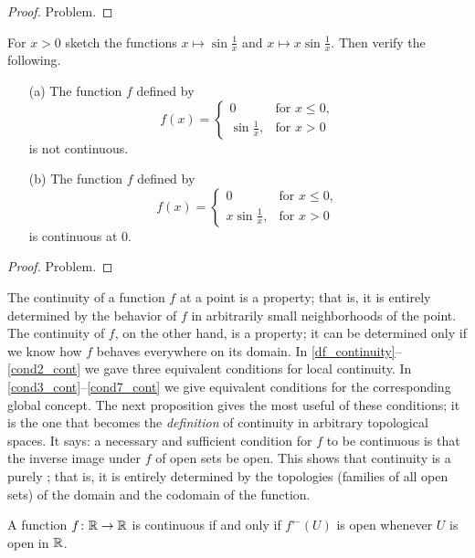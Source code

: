 \begin{proof} Problem.  \ns \end{proof}

\begin{exam} For $x > 0$ sketch the functions $x \mapsto \sin\frac1x$ and
$x \mapsto x\sin\frac1x$.  Then verify the following.
 \begin{enumerate}
  \item[(a)] The function $f$ defined by
   \[f(x) = \begin{cases}        0    &\text{for $x \le 0$}, \\
                      \sin\frac1x,    &\text{for $x > 0$}
            \end{cases}\]
is not continuous.
  \item[(b)]   The function $f$ defined by
   \[f(x) = \begin{cases}        0    &\text{for $x \le 0$}, \\
                    x \sin\frac1x,    &\text{for $x > 0$}
            \end{cases}\]
is continuous at $0$.
 \end{enumerate}
\end{exam}

\begin{proof} Problem.  \ns \end{proof}

The continuity of a function $f$ at a point is a
 property; that is, it is entirely determined by the behavior of $f$ in arbitrarily
small neighborhoods of the point. The continuity of $f$, on the other hand, is a
 property; it can be determined only if we know how $f$ behaves everywhere on its
domain.  In \ref{df_continuity}--\ref{cond2_cont} we gave three equivalent conditions for
local continuity.  In \ref{cond3_cont}--\ref{cond7_cont} we give equivalent conditions for the
corresponding global concept.  The next proposition gives the most useful of these conditions;
it is the one that becomes the \emph{definition} of continuity in arbitrary topological
spaces. It says: a necessary and sufficient condition for $f$ to be continuous is that the
inverse image under $f$ of open sets be open.  This shows that continuity is a purely
; that is, it is entirely determined by the topologies (families of
all open sets) of the domain and the codomain of the function.

\begin{prop}\label{cond3_cont} A function $f\colon\mathbb{R} \rightarrow \mathbb{R}$ is continuous if and only if
$f^\gets(U)$ is open whenever $U$ is open in $\mathbb{R}$.
\end{prop}

